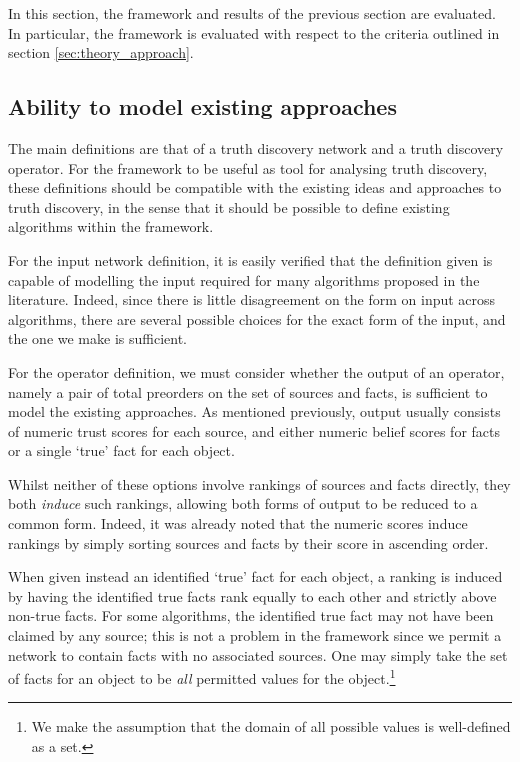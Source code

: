 \documentclass[../../main.tex]{subfiles}
\begin{document}
In this section, the framework and results of the previous section are
evaluated. In particular, the framework is evaluated with respect to the
criteria outlined in section \ref{sec:theory_approach}.

\subsection*{Ability to model existing approaches}

The main definitions are that of a truth discovery network and a truth
discovery operator. For the framework to be useful as tool for analysing truth
discovery, these definitions should be compatible with the existing ideas and
approaches to truth discovery, in the sense that it should be possible to
define existing algorithms within the framework.

For the input network definition, it is easily verified that the definition
given is capable of modelling the input required for many algorithms proposed
in the literature. Indeed, since there is little disagreement on the form on
input across algorithms, there are several possible choices for the exact form
of the input, and the one we make is sufficient.

For the operator definition, we must consider whether the output of an
operator, namely a pair of total preorders on the set of sources and facts, is
sufficient to model the existing approaches. As mentioned previously, output
usually consists of numeric trust scores for each source, and either numeric
belief scores for facts or a single `true' fact for each object.

Whilst neither of these options involve rankings of sources and facts directly,
they both \emph{induce} such rankings, allowing both forms of output to be
reduced to a common form. Indeed, it was already noted that the numeric
scores induce rankings by simply sorting sources and facts by their score in
ascending order.

When given instead an identified `true' fact for each object, a ranking is
induced by having the identified true facts rank equally to each other and
strictly above non-true facts. For some algorithms, the identified true fact
may not have been claimed by any source; this is not a problem in
the framework since we permit a network to contain facts with no associated
sources. One may simply take the set of facts for an object to be \emph{all}
permitted values for the object.\footnote{We make the assumption that the
domain of all possible values is well-defined as a set.}
\end{document}

